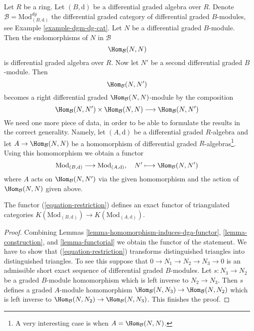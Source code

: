 \noindent
Let $R$ be a ring. Let $(B, \text{d})$ be a differential graded algebra
over $R$. Denote $\mathcal{B} = \text{Mod}^{dg}_{(B, \text{d})}$
the differential graded category of differential graded $B$-modules, see
Example \ref{example-dgm-dg-cat}. Let $N$ be a differential graded $B$-module.
Then the endomorphisms of $N$ in $\mathcal{B}$
$$
\Hom_\mathcal{B}(N, N)
$$
is differential graded algebra over $R$. Now let $N'$ be a second differential
graded $B$-module. Then
$$
\Hom_\mathcal{B}(N, N')
$$
becomes a right differential graded $\Hom_\mathcal{B}(N, N)$-module by the
composition
$$
\Hom_\mathcal{B}(N, N') \times \Hom_\mathcal{B}(N, N)
\longrightarrow
\Hom_\mathcal{B}(N, N')
$$
We need one more piece of data, in order to be able to formulate the
results in the correct generality. Namely, let $(A, \text{d})$ be a
differential graded $R$-algebra and let $A \to \Hom_\mathcal{B}(N, N)$
be a homomorphism of differential graded $R$-algebras\footnote{A very
interesting case is when $A = \Hom_\mathcal{B}(N, N)$.}. Using this
homomorphism we obtain a functor
\begin{equation}
\label{equation-restriction}
\text{Mod}_{(B, \text{d})}
\longrightarrow
\text{Mod}_{(A, \text{d})},\quad
N' \longmapsto \Hom_\mathcal{B}(N, N')
\end{equation}
where $A$ acts on $\Hom_\mathcal{B}(N, N')$ via the given homomorphism
and the action of $\Hom_\mathcal{B}(N, N)$ given above.

\begin{lemma}
\label{lemma-restriction-homotopy}
The functor (\ref{equation-restriction}) defines an exact functor
of triangulated categories
$K(\text{Mod}_{(B, \text{d})}) \to K(\text{Mod}_{(A, \text{d})})$.
\end{lemma}

\begin{proof}
Combining
Lemmas \ref{lemma-homomorphism-induces-dga-functor},
\ref{lemma-construction}, and
\ref{lemma-functorial}
we obtain the functor of the statement.
We have to show that (\ref{equation-restriction}) transforms distinguished
triangles into distinguished triangles. To see this
suppose that $0 \to N_1 \to N_2 \to N_3 \to 0$ is an admissible short
exact sequence of differential graded $B$-modules. Let $s : N_3 \to N_2$
be a graded $B$-module homomorphism which is left inverse to $N_2 \to N_3$.
Then $s$ defines a graded $A$-module homomorphism
$\Hom_\mathcal{B}(N, N_3) \to \Hom_\mathcal{B}(N, N_2)$
which is left inverse to
$\Hom_\mathcal{B}(N, N_2) \to \Hom_\mathcal{B}(N, N_3)$.
This finishes the proof.
\end{proof}

